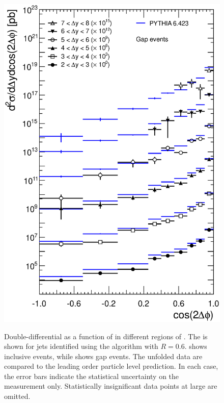 \begin{figure}[htpb]
{    \includegraphics[width=\smallfigwidth]{chapters/azimuthal-decorrelation/Gap.CrossSection.all_dy_slices.CosTwoDeltaPhiBins.eps}
    \label{fig:azimuthal-decorrelation:cross-section_CosTwoDeltaPhi_gap}}
  \caption{Double-differential \xs as a function of \cosTwoDPhi in different regions of \DeltaY.
           The \xs is shown for jets identified using the \akt algorithm with
           $R=0.6$. \protect{}
           shows inclusive events, while \protect{}
           shows gap events. The unfolded data are compared to the leading order particle
           level  prediction. In each case, the error bars
           indicate the statistical uncertainty on the measurement only. Statistically
           insignificant data points at large \DeltaY are omitted.}
  \label{fig:azimuthal-decorrelation:cross-sections_cosTwoDPhi}
\end{figure}

